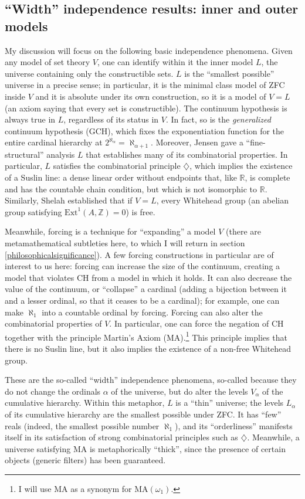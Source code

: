\documentclass[letterpaper,12pt]{article}
\newcommand{\Z}{\mathbb{Z}}
\begin{document}
\subsection{``Width'' independence results: inner and outer models}
\label{width}
My discussion will focus on the following basic independence phenomena. Given any model of set theory $V$, one can identify within it the inner model $L$, the universe containing only the constructible sets. $L$ is the ``smallest possible'' universe in a precise sense; in particular, it is the minimal class model of ZFC inside $V$ and it is absolute under its own construction, so it is a model of $V=L$ (an axiom saying that every set is constructible). The continuum hypothesis is always true in $L$, regardless of its status in $V$. In fact, so is the \emph{generalized} continuum hypothesis (GCH), which fixes the exponentiation function for the entire cardinal hierarchy at $2^{\aleph_\alpha} = \aleph_{\alpha + 1}$. Moreover, Jensen gave a ``fine-structural'' analysis $L$ that establishes many of its combinatorial properties. In particular, $L$ satisfies the combinatorial principle $\diamondsuit$, which implies the existence of a Suslin line: a dense linear order without endpoints that, like $\mathbb{R}$, is complete and has the countable chain condition, but which is not isomorphic to $\mathbb{R}$. Similarly, Shelah established that if $V = L$, every Whitehead group (an abelian group satisfying $\mathrm{Ext}^1(A, \Z) = 0$) is free.

Meanwhile, forcing is a technique for ``expanding'' a model $V$ (there are metamathematical subtleties here, to which I will return in section \ref{philosophicalsignificance}). A few forcing constructions in particular are of interest to us here: forcing can increase the size of the continuum, creating a model that violates CH from a model in which it holds. It can also decrease the value of the continuum, or ``collapse'' a cardinal (adding a bijection between it and a lesser ordinal, so that it ceases to be a cardinal); for example, one can make $\aleph_1$ into a countable ordinal by forcing. Forcing can also alter the combinatorial properties of $V$. In particular, one can force the negation of CH together with the principle Martin's Axiom (MA).\footnote{I will use MA as a synonym for $\mathrm{MA}(\omega_1)$.} This principle implies that there is no Suslin line, but it also implies the existence of a non-free Whitehead group.

These are the so-called ``width'' independence phenomena, so-called because they do not change the ordinals $\alpha$ of the universe, but do alter the levels $V_\alpha$ of the cumulative hierarchy. Within this metaphor, $L$ is a ``thin'' universe; the levels $L_\alpha$ of its cumulative hierarchy are the smallest possible under ZFC. It has ``few'' reals (indeed, the smallest possible number $\aleph_1$), and its ``orderliness'' manifests itself in its satisfaction of strong combinatorial principles such as $\diamondsuit$. Meanwhile, a universe satisfying MA is metaphorically ``thick'', since the presence of certain objects (generic filters) has been guaranteed.
\end{document}
